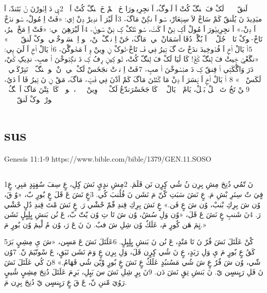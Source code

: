 \documentclass[12pt,fleqn,titlepage,twoside,a4paper]{book}
\begin{document}
\begin{arab}[utf]

\section*{}
وࣹ نࣷ لَنقّ کࣹ فࣷݒْ لَکْ فَ لࣹنگّ کُتْ اَ لَيࣷوگُ، اَ نجِرِيݧࣷورَا خَ ࢣࣹلࣹمْ خَ لࣹنگّ کُتْ اَخࣹ؞ 2 يࣹ دَ اِنࣷورْنَ نࣷ بَتَندّ، اَ مبَدِيدَ نَ يُلَنقّ کَمْ سَاخْ لاَ سِنࣹعَارْ، سࣷو اَ نگࣹنْ مَاگَ؞ 3 اَ لَيْرَ اَ ندࣹيرْ دࣹنْ اࣹي‏: «فَتْ اِ مُولْ، سࣷو ندࣷخْ اَ دࣹنْ؞» اَ نجِرِيݧࣷورَ اَ مُولْ اَکࣹ نࣹنْ اَ کَݖْ، سࣷو ࢣࣷکْ کࣹ نࣹنْ سࣷوݧْ؞ 4 اَ لَيْرَهِنَ يࣹي‏: «فَتْ اِ مَخْ تࣹيرُ، تَاخْ‏‏-تࣷوکْ نَا اࣷ جُلْ اࣷلࣹ اَ بُگْکࣷ دُقَا اَسَمَانْ فࣹي؞ مَاگَ، خَنْ اِ نجࣹگْ گࣷنْ، تࣷو اِ ݒَسَرࣷوخْکࣹي تࣷوکْ لَنقّ کࣹ فࣷݒْ؞» 
 5 اࣷ يَالْ اࣷخࣹ اَ فُدࣷوخِيدَ ندَخْ تَ گَ تࣹيرُ فࣹي فࣷ تَاخْ‏‏-تࣷوکْ نࣹ وِينْ وࣹ اَ مَخࣷوگْنَ؞ 6 اࣷ يَالْ اࣷخࣹ اَ لَيَ يࣹي‏: «نگَعْيࣷ خࣹيتْ فَ لࣹنگّ کࣷݝْ! کَا لَيَا لَکْ فَ لࣹنگّ کُتْ، تࣷو کࣹينࣹ رࣹفُ کࣹ دَ نگࣹبࣷوخْنَ اࣷ مبِ؞ ندِيکِ کࣷيْ، دَرَ وَاگْکَتࣹي اࣷ فِنقّ کࣹ دَ مبࣷسࣷوخْنَ اࣷ مبِ؞ 7 فَتْ اِ ندࣹتْ نجَخَسْ لَکْ فࣹي دࣹنْ بࣷو لࣹنگّ وࣹ نَنِرْکَتࣹي فࣷ لَکَسْ وࣹ؞» 8  اࣷ يَالْ اࣷخࣹ اَ ݒَسَرَ اَ دࣹنْ مَا گࣷࢣْنَ مَاگَ کَمْ اَدْنَ فࣹي فࣷݒْ؞ مَاگَ، مَقْ نࣹ نَ تࣹيرُ فَا اَ دَيُ؞ 9 تࣹنْ تَخُ تَ نࣹعࣹلْ بَبࣹلْ، يَامْ اࣷ يَالْ اࣷخࣹ کَا جَخَسْرَندّعُ لَکْ کࣹ نࣷ وِينْ وࣹ فࣷݒْ، تࣷو نࣷ کَا خࣷتِتْنَ مَاگَ اَ سࣷگُ اࣷ ݒِݖْتࣷورْ تࣷوکْ لَنقّ کࣹ فࣷݒْ؞ 

\end{arab}

\section{sus}

Genesis 11:1-9 https://www.bible.com/bible/1379/GEN.11.SOSO

\begin{arab}[utf]
\section*{}

1نَ تّمُي دُنِحَ مِشِ بِرِن نُ شُي كٍرٍن نَن قَلَمَ. 2مِشِ ندٍيٍ نَشَ كٍلِ، عٍ سِفَ سٌفٍتٍدٍ مَبِرِ، عٍ فٍيَ تٌ سِنَرِ بْشِ مَ. عٍ نَشَ سَبَتِ كّنّ مَ نَشَن نَ فُلُنبَ كُي. 3عٍ نَشَ عَ قَلَ عٍ بٌورٍ بّ، «وٌ قَ، وٌن شَ بِرِكِ بْنبْ، وٌن شَ عٍ فَن.» عٍ نَشَ بِرِكِ قِندِ فّمّ حْشْي رَ. عٍ نَشَ مْتَ قِندِ دٌلٍ حْشْي رَ. 4نَ شَنبِ عٍ نَشَ عَ قَلَ، «وٌن وَلِ سُشُ، وٌن شَ تَا تِ وٌن يّتّ بّ، عَ نُن بَنشِ بٍلٍبٍلٍ نَشَن تٍمَ هَن كٌورٍ مَ، عَلَكٌ وٌن شِلِ شَ فبٌ. نَ نَ عَ رَ، وٌن مُ لْيمَ وٌن بٌورٍ مَ.»

5كْنْ عَلَتَلَ نَشَ فٌرٌ نَ تَا مَتٌدٍ، عَ نُن نَ بَنشِ بٍلٍبٍلٍ. 6عَلَتَلَ نَشَ عَ مَسٍن، «شَ يِ مِشِيٍ بَرَ كَقُ عٍ بٌورٍ مَ يِ وَلِ رَبَدٍ، عٍ نَ شُي كٍرٍن قَلَ، وَلِ بِرِن عٍ وَ مَ نَشَن نَبَقٍ، عَ سْونّيَمَ نّ. 7وٌن شّي، وٌن شَ فٌرٌ عٍ شَ شُي مَسُنبُدٍ عَلَكٌ عٍ نَشَ عٍ بٌورٍ وْيّن شُي قَهَامُ.» 8نَ كُي عَلَتَلَ نَشَ نَ فَلِ رَيٍنسٍن يّ. نَ بَنشِ تِقٍ نَشَ دَن. 9نَ يِرٍ شِلِ نَشَ سَ بَبٍلِ، بَرِ مَ عَلَتَلَ دُنِحَ مِشِيٍ شُييٍ رَوُيَ مّننِ نّ، عَ قَ عٍ رَيٍنسٍن يّ دُنِحَ بِرِن مَ.


\end{arab}
\end{document}
